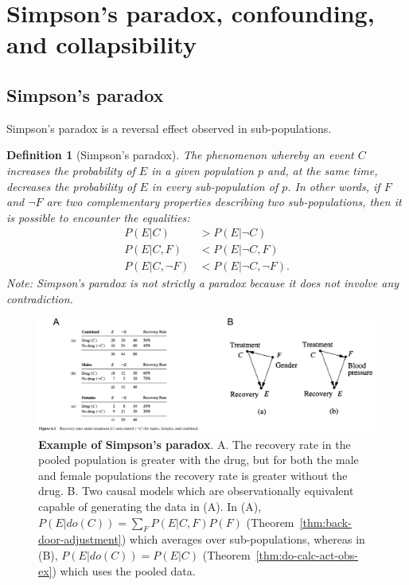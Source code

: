 \documentclass[11pt]{article}
\numberwithin{equation}{section}
\newtheorem{defn}{Definition}[section]
\begin{document}
\section{Simpson's paradox, confounding, and collapsibility} \label{sec:simpson-confounding-collapsibility}

\subsection{Simpson's paradox}
Simpson's paradox is a reversal effect observed in sub-populations.

\begin{defn}[Simpson's paradox]
The phenomenon whereby an event $C$ increases the probability of $E$ in a given population $p$ and, at the same time, decreases the probability of $E$ in every sub-population of $p$. In other words, if $F$ and $\neg F$ are two complementary properties describing two sub-populations, then it is possible to encounter the equalities:
\begin{align}
P(E|C) &> P(E|\neg C) \\
P(E|C,F) &< P(E| \neg C, F) \nonumber \\
P(E|C, \neg F) &< P(E| \neg C, \neg F). \nonumber
\end{align}
Note: Simpson's paradox is not strictly a paradox because it does not involve any contradiction.
\end{defn}

\begin{figure}
\begin{center}
\includegraphics[width=0.8\columnwidth]{figures/simpson.png}  
\end{center}
\caption{\textbf{Example of Simpson's paradox}. A. The recovery rate in the pooled population is greater with the drug, but for both the male and female populations the recovery rate is greater without the drug. B. Two causal models which are observationally equivalent capable of generating the data in (A). In (A), $P(E|do(C)) = \sum_F P(E|C,F) P(F)$  (Theorem~\ref{thm:back-door-adjustment}) which averages over sub-populations, whereas in (B), $P(E|do(C)) = P(E|C)$ (Theorem~\ref{thm:do-calc-act-obs-ex}) which uses the pooled data.
}
\label{Fig:simpson}
\end{figure}
\end{document}
